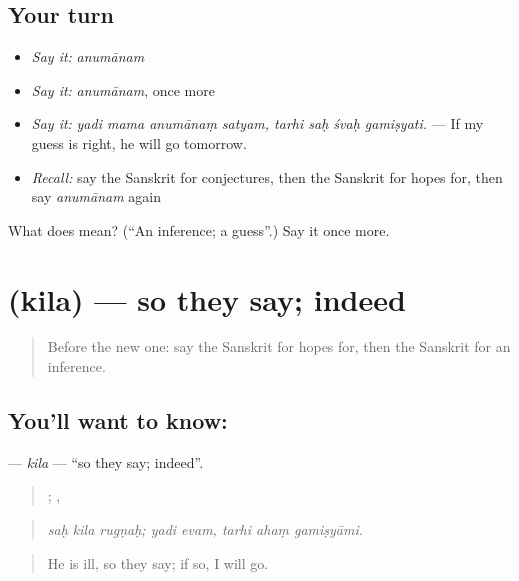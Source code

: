 \subsection*{Your turn}
\begin{itemize}
\raggedright
  \item \emph{Say it:} \emph{anumānam}
  \item \emph{Say it:} \emph{anumānam}, once more
  \item \emph{Say it:} \emph{yadi mama anumānaṃ satyam, tarhi saḥ śvaḥ gamiṣyati.} — If my guess is right, he will go tomorrow.
  \item \emph{Recall:} say the Sanskrit for conjectures, then the Sanskrit for hopes for, then say \emph{anumānam} again
\end{itemize}

\begin{tcolorbox}[breakable,colback=teal!4,colframe=teal!35!black,title={Before you move on}]
What does  mean? (\textquotedblleft{}An inference; a guess\textquotedblright{}.) Say it once more.
\end{tcolorbox}
\section[\texorpdfstring{\sk{किल} (kila)}{किल (kila)}]{ (kila) — so they say; indeed}

\label{lesson:SA-C368-kila}



\begin{quote}
Before the new one: say the Sanskrit for hopes for, then the Sanskrit for an inference.
\end{quote}

\subsection*{You'll want to know: }
\textbf{} — \emph{kila} — \textquotedblleft{}so they say; indeed\textquotedblright{}.

\begin{quote}
  ;  ,   
\end{quote}

\begin{quote}
\emph{saḥ kila rugṇaḥ; yadi evam, tarhi ahaṃ gamiṣyāmi.}
\end{quote}

\begin{quote}
He is ill, so they say; if so, I will go.
\end{quote}

